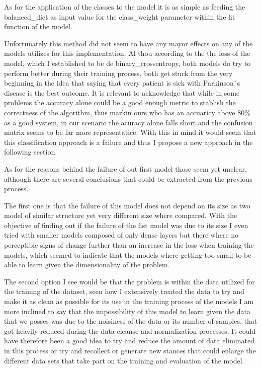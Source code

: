 \documentclass[12pt, a4paper]{article}
\begin{document}
	\vspace{5mm}
	
	As for the application of the classes to the model it is as simple as feeding the balanced\_dict as input value for the  class\_weight parameter within the fit function of the model.
	
	Unfortunately this method did not seem to have any mayor effects on any of the models utilizes for this implementation. Al thou according to the the loss of the model, which I established to be de binary\_crossentropy, both models do try to perform better during their training process, both get stuck from the very beginning in the idea that saying that every patient is sick with Parkinson´s disease is the best outcome. It is relevant to acknowledge that while in some problems the accuracy alone could be a good enough metric to stablish the correctness of the algorithm, thus markin ours who has an accuaricy above 80\% as a good system, in our scenario the acuracy alone falls short and the confusion matrix seems to be far more representatice. With this in mind it would seem that this classification approach is a failure and thus I propose a new approach in the following section.
	
	As for the reasons behind the failure of out first model those seem yet unclear, although there are several conclusions that could be extracted from the previous process.
	
	The first one is that the failure of this model does not depend on its size as two model of similar structure yet very different size where compared. With the objective of finding out if the failure of the fist model was due to its size I even tried with smaller models composed of only dense layers but there where no perceptible signs of change further than an increase in the loss when training the models, which seemed to indicate that the models where getting too small to be able to learn given the dimensionality of the problem.
	
	The second option I see would be that the problem is within the data utilized for the training of the dataset, seen how I extensively treated the data to try and make it as clean as possible for its use in the training process of the models I am more inclined to say that the impossibility of this model to learn given the data that we posses was due to the noisiness of the data or its number of samples, that got heavily reduced during the data cleanse and normalization processes. It could have therefore been a good idea to try and reduce the amount of data eliminated in this process or try and recollect or generate new stances that could enlarge the different data sets that take part on the training and evaluation of the model.
	
\end{document}
